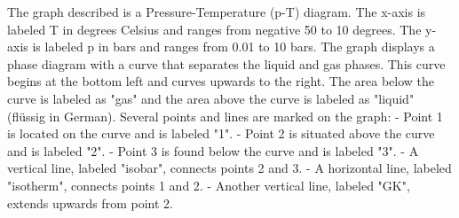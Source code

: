 The graph described is a Pressure-Temperature (p-T) diagram. The x-axis is labeled T in degrees Celsius and ranges from negative 50 to 10 degrees. The y-axis is labeled p in bars and ranges from 0.01 to 10 bars. The graph displays a phase diagram with a curve that separates the liquid and gas phases. This curve begins at the bottom left and curves upwards to the right. The area below the curve is labeled as "gas" and the area above the curve is labeled as "liquid" (flüssig in German). Several points and lines are marked on the graph:
- Point 1 is located on the curve and is labeled "1".
- Point 2 is situated above the curve and is labeled "2".
- Point 3 is found below the curve and is labeled "3".
- A vertical line, labeled "isobar", connects points 2 and 3.
- A horizontal line, labeled "isotherm", connects points 1 and 2.
- Another vertical line, labeled "GK", extends upwards from point 2.